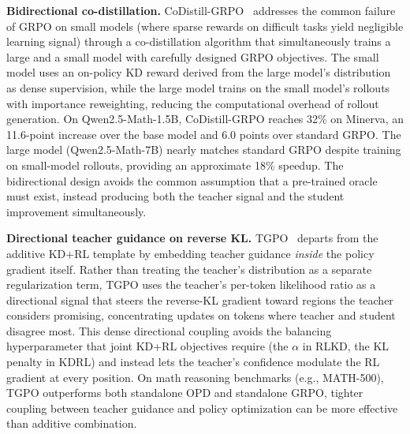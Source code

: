 \documentclass{article} %
\begin{document}
\textbf{Bidirectional co-distillation.} CoDistill-GRPO~\citep{2605.08873} addresses the common failure of GRPO on small models (where sparse rewards on difficult tasks yield negligible learning signal) through a co-distillation algorithm that simultaneously trains a large and a small model with carefully designed GRPO objectives. The small model uses an on-policy KD reward derived from the large model's distribution as dense supervision, while the large model trains on the small model's rollouts with importance reweighting, reducing the computational overhead of rollout generation. On Qwen2.5-Math-1.5B, CoDistill-GRPO reaches 32\% on Minerva, an 11.6-point increase over the base model and 6.0 points over standard GRPO. The large model (Qwen2.5-Math-7B) nearly matches standard GRPO despite training on small-model rollouts, providing an approximate 18\% speedup. The bidirectional design avoids the common assumption that a pre-trained oracle must exist, instead producing both the teacher signal and the student improvement simultaneously.

\textbf{Directional teacher guidance on reverse KL.} TGPO~\citep{2605.13230} departs from the additive KD+RL template by embedding teacher guidance \emph{inside} the policy gradient itself. Rather than treating the teacher's distribution as a separate regularization term, TGPO uses the teacher's per-token likelihood ratio as a directional signal that steers the reverse-KL gradient toward regions the teacher considers promising, concentrating updates on tokens where teacher and student disagree most. This dense directional coupling avoids the balancing hyperparameter that joint KD+RL objectives require (the $\alpha$ in RLKD, the KL penalty in KDRL) and instead lets the teacher's confidence modulate the RL gradient at every position. On math reasoning benchmarks (e.g., MATH-500), TGPO outperforms both standalone OPD and standalone GRPO, tighter coupling between teacher guidance and policy optimization can be more effective than additive combination.
\end{document}
